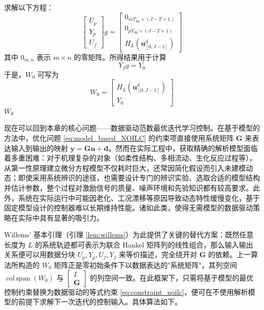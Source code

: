 \begin{algorithm}[H]
	\small
	\SetAlgoLined
	\caption{零初始条件子行为的数据驱动矩阵计算}
	\label{alg:zero_initial_matrix}
	求解以下方程：
	\begin{equation}
		\begin{bmatrix} U_p \\ Y_p \\ U_f \end{bmatrix} g =
		\begin{bmatrix}
			0_{mT_{\mathrm{ini}} \times (J - T + 1)} \\
			0_{pT_{\mathrm{ini}} \times (J - T + 1)} \\
			H_L(\mathbf{u}^{\mathrm{d}}_{[0,J-1]})
		\end{bmatrix}
		\label{eq:solve_g}
	\end{equation}
	其中 $0_{m,n}$ 表示 $m \times n$ 的零矩阵。所得结果用于计算
	\begin{equation}
		Y_f g = Y_0
		\label{eq:Y0}
	\end{equation}
	于是，$W_0$ 可写为
	\begin{equation}
		W_0 = \begin{bmatrix} H_L(\mathbf{u}^{\mathrm{d}}_{[0,J-1]}) \\ Y_0 \end{bmatrix}
		\label{eq:W_0}
	\end{equation}
	\Return $W_0$
\end{algorithm}
现在可以回到本章的核心问题——数据驱动范数最优迭代学习控制。在基于模型的方法中，优化问题 \eqref{eq:model_based_NOILC} 的约束项直接使用系统矩阵 $\mathbf{G}$ 来表达输入到输出的映射 $\mathbf{y} = \mathbf{G}\mathbf{u} + \mathbf{d}$。然而在实际工程中，获取精确的解析模型面临着多重困难：对于机理复杂的对象（如柔性结构、多相流动、生化反应过程等），从第一性原理建立微分方程模型不仅耗时巨大，还常因简化假设而引入未建模动态；即使采用系统辨识的途径，也需要设计专门的辨识实验、选取合适的模型结构并估计参数，整个过程对激励信号的质量、噪声环境和先验知识都有较高要求。此外，系统在实际运行中可能因老化、工况漂移等原因导致动态特性缓慢变化，基于固定模型设计的控制器难以长期维持性能。诸如此类，使得无需模型的数据驱动策略在实际中具有显著的吸引力。

Willems' 基本引理（引理 \ref{lem:willems}）为此提供了关键的替代方案：既然任意长度为 $L$ 的系统轨迹都可表示为联合 Hankel 矩阵列的线性组合，那么输入输出关系便可以用数据分块 $U_p, Y_p, U_f, Y_f$ 来等价描述，完全绕开对 $\mathbf{G}$ 的依赖。上一算法所构造的 $W_0$ 矩阵正是零初始条件下以数据表达的"系统矩阵"，其列空间 $\operatorname{col\,span}(W_0)$ 与 $\begin{bmatrix} I \\ \mathbf{G} \end{bmatrix}$ 的列空间一致。在此框架下，只需将基于模型的最优控制约束替换为数据驱动的等式约束 \eqref{eq:constraint_noilc}，便可在不使用解析模型的前提下求解下一次迭代的控制输入。具体算法如下。

